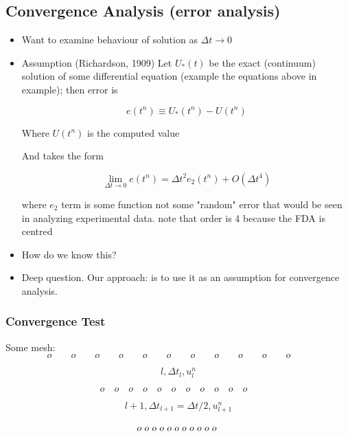 \subsection{Convergence Analysis (error analysis)}

\begin{itemize}
    \item Want to examine behaviour of solution as $\Delta t \rightarrow 0$

    \item Assumption (Richardson, 1909) Let $U_*(t)$ be the exact (continuum) solution of some differential equation (example the equations above in example); then error is 

    \[ e(t^n) \equiv U_*(t^n) - U(t^n)\]

    Where $U(t^n)$ is the computed value

    \vspace{10px}

    And takes the form 

    \[ \lim_{\Delta t \rightarrow 0} e(t^n) = \Delta t^2 e_2(t^n) + O(\Delta t^4)\]

    where $e_2$ term is some function not some "random" error that would be seen in analyzing experimental data.
    \vspace{10px}
    note that order is 4 because the FDA is centred

    \item How do we know this?

    \item Deep question. Our approach: is to use it as an assumption for convergence analysis.
\end{itemize}

\subsubsection{Convergence Test}

Some mesh:
\[ o \qquad o \qquad o \qquad o \qquad o \qquad o \qquad o \qquad o \qquad o \qquad o \qquad o \qquad \]

\[ l, \Delta t_l, u_l^n\]

\[ o \quad o \quad o \quad o \quad o \quad o \quad o \quad o \quad o \quad o \quad o \quad \]

\[ l+1, \Delta t_{l+1} = \Delta t/2, u_{l+1}^n\]

\[ o \hspace{3 px} o \hspace{3 px} o \hspace{3 px} o \hspace{3 px} o \hspace{3 px} o \hspace{3 px} o \hspace{3 px} o \hspace{3 px} o \hspace{3 px} o \hspace{3 px} o \hspace{3 px} \]

